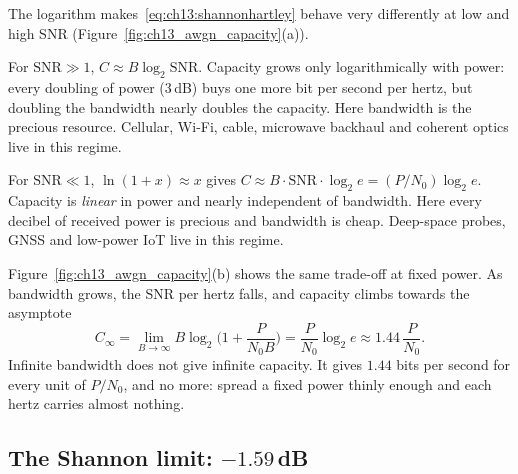 The logarithm makes~\eqref{eq:ch13:shannonhartley} behave very differently at low and high SNR
(Figure~\ref{fig:ch13_awgn_capacity}(a)).
\begin{description}[style=nextline,leftmargin=1.2em,font=\sffamily\bfseries\small\color{navy}]
\item[High SNR: bandwidth-limited.] For $\mathrm{SNR}\gg1$, $C\approx B\log_2\mathrm{SNR}$. Capacity
grows only logarithmically with power: every doubling of power (3\,dB) buys one more bit per second
per hertz, but doubling the bandwidth nearly doubles the capacity. Here bandwidth is the precious
resource. Cellular, Wi-Fi, cable, microwave backhaul and coherent optics live in this regime.
\item[Low SNR: power-limited.] For $\mathrm{SNR}\ll1$, $\ln(1+x)\approx x$ gives
$C\approx B\cdot\mathrm{SNR}\cdot\log_2e=(P/N_0)\log_2e$. Capacity is \emph{linear} in power and
nearly independent of bandwidth. Here every decibel of received power is precious and bandwidth is
cheap. Deep-space probes, GNSS and low-power IoT live in this regime.
\end{description}

Figure~\ref{fig:ch13_awgn_capacity}(b) shows the same trade-off at fixed power. As bandwidth grows,
the SNR per hertz falls, and capacity climbs towards the asymptote
\begin{equation}
C_\infty=\lim_{B\to\infty}B\log_2\!\Big(1+\frac P{N_0B}\Big)=\frac P{N_0}\log_2e\approx1.44\,\frac P{N_0}.
\label{eq:ch13:cinf}
\end{equation}
Infinite bandwidth does not give infinite capacity. It gives $1.44$ bits per second for every
unit of $P/N_0$, and no more: spread a fixed power thinly enough and each hertz carries almost
nothing.


\subsection{The Shannon limit: $-1.59$\,dB}

